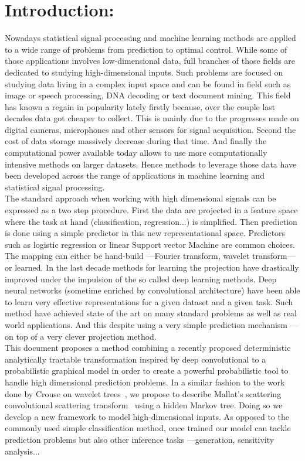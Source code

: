 \documentclass[a4paper,11pt]{report}
\begin{document}
\chapter{Introduction:}
	\label{chap:Intro}
	
	Nowadays statistical signal processing and machine learning methods are applied to a wide range of problems from prediction to optimal control. While some of those applications involves low-dimensional data, full branches of those fields are dedicated to studying high-dimensional inputs. Such problems are focused on studying data living in a complex input space and can be found in field such as image or speech processing, DNA decoding or text document mining. This field has known a regain in popularity lately firstly because, over the couple last decades data got cheaper to collect. This is mainly due to the progresses made on digital cameras, microphones and other sensors for signal acquisition. Second the cost of data storage massively decrease during that time. And finally the computational power available today allows to use more computationally intensive methods on larger datasets. Hence methods to leverage those data have been developed across the range of applications in machine learning and statistical signal processing.\\
	
	The standard approach when working with high dimensional signals can be expressed as a two step procedure. First the data are projected in a feature space where the task at hand (classification, regression...) is simplified. Then prediction is done using a simple predictor in this new representational space. Predictors such as logistic regression or linear Support vector Machine are common choices. The mapping can either be hand-build ---\eg Fourier transform, wavelet transform--- or learned. In the last decade methods for learning the projection have drastically improved under the impulsion of the so called deep learning methods. Deep neural networks (sometime enriched by convolutional architecture) have been able to learn very effective representations for a given dataset and a given task. Such method have achieved state of the art on many standard problems as well as real world applications. And this despite using a very simple prediction mechanism ---on top of a very clever projection method.\\
	
	This document proposes a method combining a recently proposed deterministic analytically tractable transformation inspired by deep convolutional to a probabilistic graphical model in order to create a powerful probabilistic tool to handle high dimensional prediction problems. In a similar fashion to the work done by Crouse on wavelet trees~\citep{crouse1998wavelet}, we propose to describe Mallat's scattering convolutional scattering transform~\citep{bruna2010classification} using a hidden Markov tree. Doing so we develop a new framework to model high-dimensional inputs. As opposed to the commonly used simple classification method, once trained our model can tackle prediction problems but also other inference tasks ---\eg generation, sensitivity analysis...
	
\end{document}
